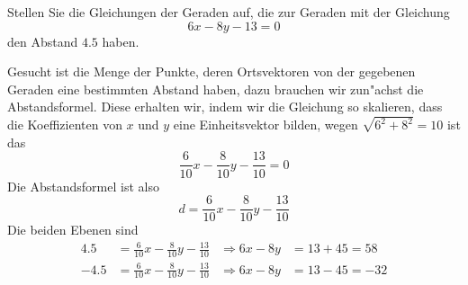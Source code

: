 Stellen Sie die Gleichungen der Geraden auf, die zur Geraden mit der
Gleichung
\[
6x-8y-13=0
\]
den Abstand $4.5$ haben.

\begin{loesung}
Gesucht ist die Menge der Punkte, deren Ortsvektoren von der gegebenen
Geraden eine bestimmten Abstand haben, dazu brauchen wir zun"achst die
Abstandsformel. Diese erhalten wir, indem wir die Gleichung so skalieren,
dass die Koeffizienten von $x$ und $y$ eine Einheitsvektor bilden,
wegen $\sqrt{6^2+8^2}=10$ ist das
\[
\frac{6}{10}x-\frac{8}{10}y-\frac{13}{10}=0
\]
Die Abstandsformel ist also
\[
d =\frac{6}{10}x-\frac{8}{10}y-\frac{13}{10}
\]
Die beiden Ebenen sind
\begin{align*}
4.5&=\frac{6}{10}x-\frac{8}{10}y-\frac{13}{10}&\Rightarrow
6x-8y&=13+45=58
\\
-4.5&=\frac{6}{10}x-\frac{8}{10}y-\frac{13}{10}&\Rightarrow
6x-8y&=13-45=-32
\end{align*}

\end{loesung}

